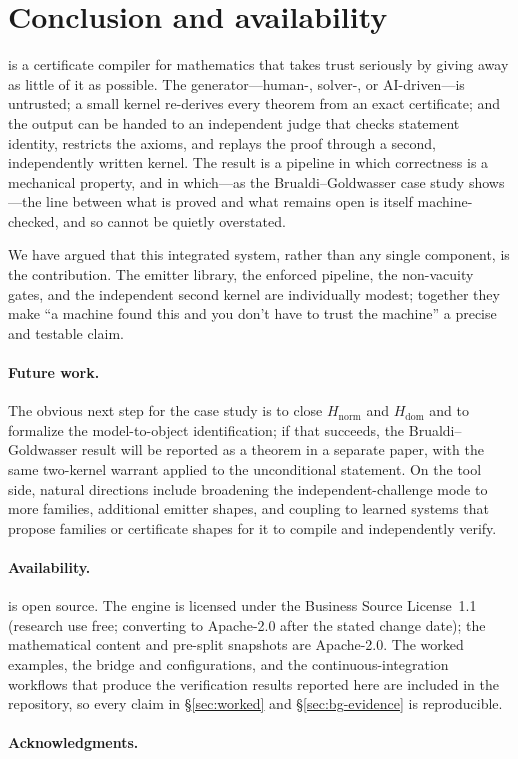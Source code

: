 \section{Conclusion and availability}
\label{sec:concl}

\Telperion{} is a certificate compiler for mathematics that takes trust seriously by
giving away as little of it as possible. The generator---human-, solver-, or
AI-driven---is untrusted; a small kernel re-derives every theorem from an exact
certificate; and the output can be handed to an independent judge that checks
statement identity, restricts the axioms, and replays the proof through a second,
independently written kernel. The result is a pipeline in which correctness is a
mechanical property, and in which---as the Brualdi--Goldwasser case study shows---the
line between what is proved and what remains open is itself machine-checked, and so
cannot be quietly overstated.

We have argued that this integrated system, rather than any single component, is the
contribution. The emitter library, the enforced pipeline, the non-vacuity gates, and
the independent second kernel are individually modest; together they make ``a machine
found this and you don't have to trust the machine'' a precise and testable claim.

\paragraph{Future work.} The obvious next step for the case study is to close
$H_{\mathrm{norm}}$ and $H_{\mathrm{dom}}$ and to formalize the model-to-object
identification; if that succeeds, the Brualdi--Goldwasser result will be reported as
a theorem in a separate paper, with the same two-kernel warrant applied to the
unconditional statement. On the tool side, natural directions include broadening the
independent-challenge mode to more families, additional emitter shapes, and coupling
\Telperion{} to learned systems that propose families or certificate shapes for it
to compile and independently verify.

\paragraph{Availability.} \Telperion{} is open source.  The engine is licensed under the Business Source
License~1.1 (research use free; converting to Apache-2.0 after the stated change
date); the mathematical content and pre-split snapshots are Apache-2.0.  The worked examples, the
\Comparator{} bridge and configurations, and the continuous-integration workflows
that produce the verification results reported here are included in the repository,
so every claim in \S\ref{sec:worked} and \S\ref{sec:bg-evidence} is reproducible.

\paragraph{Acknowledgments.} 
